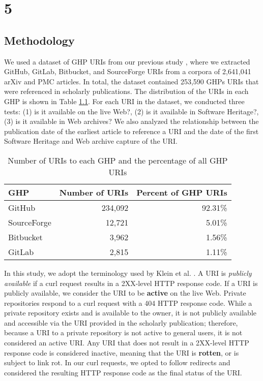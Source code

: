 \chapter{5}
\label{ch:5}

\section{Methodology}
We used a dataset of GHP URIs from our previous study \cite{escamilla-tpdl2022}, where we extracted GitHub, GitLab, Bitbucket, and SourceForge URIs from a corpora of 2,641,041 arXiv and PMC articles. In total, the dataset contained 253,590 GHPs URIs that were referenced in scholarly publications. The distribution of the URIs in each GHP is shown in Table \ref{tab:ghps}. For each URI in the dataset, we conducted three tests: (1) is it available on the live Web?, (2) is it available in Software Heritage?, (3) is it available in Web archives? We also analyzed the relationship between the publication date of the earliest article to reference a URI and the date of the first Software Heritage and Web archive capture of the URI. 

\begin{table}
    \centering
    \begin{tabular}{|l|r|r|}
    \hline
    GHP & Number of URIs & Percent of GHP URIs\\ 
    \hline
    GitHub & 234,092 & 92.31\% \\
    SourceForge & 12,721 & 5.01\% \\
    Bitbucket & 3,962 & 1.56\% \\
    GitLab & 2,815 & 1.11\% \\
    \hline
    \end{tabular}
    \caption{Number of URIs to each GHP and the percentage of all GHP URIs}
    \label{tab:ghps}
\end{table}

In this study, we adopt the terminology used by Klein et al. \cite{klein-plos2014}. A URI is \emph{publicly available} if a curl request results in a 2XX-level HTTP response code. If a URI is publicly available, we consider the URI to be \textbf{active} on the live Web. Private repositories respond to a curl request with a 404 HTTP response code. While a private repository exists and is available to the owner, it is not publicly available and accessible via the URI provided in the scholarly publication; therefore, because a URI to a private repository is not active to general users, it is not considered an active URI. Any URI that does not result in a 2XX-level HTTP response code is considered inactive, meaning that the URI is \textbf{rotten}, or is subject to link rot. In our curl requests, we opted to follow redirects and considered the resulting HTTP response code as the final status of the URI. 

